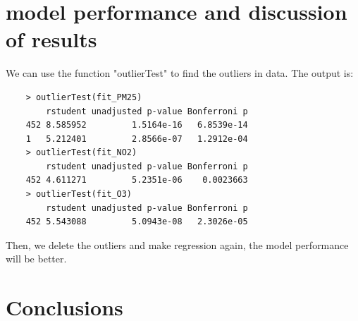 \documentclass[a4paper,12pt,reqno]{report}
\begin{document}
\section{model performance and discussion of results}
\label{sec:model performance and discussion of results}
We can use the function "outlierTest" to find the outliers in data. The output is:
\begin{lstlisting}
    > outlierTest(fit_PM25)
        rstudent unadjusted p-value Bonferroni p
    452 8.585952         1.5164e-16   6.8539e-14
    1   5.212401         2.8566e-07   1.2912e-04
    > outlierTest(fit_NO2)
        rstudent unadjusted p-value Bonferroni p
    452 4.611271         5.2351e-06    0.0023663
    > outlierTest(fit_O3)
        rstudent unadjusted p-value Bonferroni p
    452 5.543088         5.0943e-08   2.3026e-05
\end{lstlisting}



Then, we delete the outliers and make regression again, the model performance will be better.


\section{Conclusions}
    
\newpage


\end{document}
